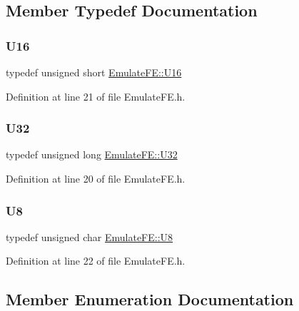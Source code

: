 \subsection{Member Typedef Documentation}
\mbox{\label{classEmulateFE_ae3af71615d90d5e7ee4de109e8a79c5f}} 
\subsubsection{\texorpdfstring{U16}{U16}}
{\footnotesize\ttfamily typedef unsigned short \hyperlink{classEmulateFE_ae3af71615d90d5e7ee4de109e8a79c5f}{Emulate\+F\+E\+::\+U16}}



Definition at line 21 of file Emulate\+F\+E.\+h.

\mbox{\label{classEmulateFE_abc39ad2fcef684d453760193ac4ddd49}} 
\subsubsection{\texorpdfstring{U32}{U32}}
{\footnotesize\ttfamily typedef unsigned long \hyperlink{classEmulateFE_abc39ad2fcef684d453760193ac4ddd49}{Emulate\+F\+E\+::\+U32}}



Definition at line 20 of file Emulate\+F\+E.\+h.

\mbox{\label{classEmulateFE_a8aa884f739fca2855ff8fb6bf3cddcff}} 
\subsubsection{\texorpdfstring{U8}{U8}}
{\footnotesize\ttfamily typedef unsigned char \hyperlink{classEmulateFE_a8aa884f739fca2855ff8fb6bf3cddcff}{Emulate\+F\+E\+::\+U8}}



Definition at line 22 of file Emulate\+F\+E.\+h.



\subsection{Member Enumeration Documentation}
\mbox{\label{classAttrib_a69e171d7cc6417835a5a306d3c764235}} 
